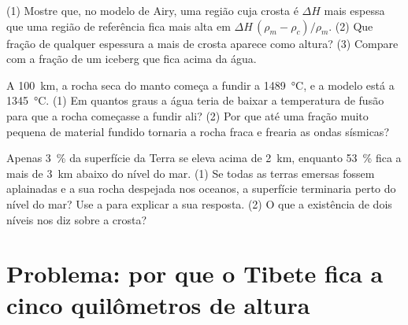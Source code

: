 \begin{exercise}[$\star\star\star$]\label{exo:g11:lithosphere-asthenosphere:13}
(1) Mostre que, no modelo de Airy, uma região cuja crosta é $\Delta H$ mais
espessa que uma região de referência fica mais alta em
$\Delta H\,(\rho_m - \rho_c)/\rho_m$. (2) Que fração de qualquer espessura a
mais de crosta aparece como altura? (3) Compare com a fração de um iceberg
que fica acima da água.
\end{exercise}

\begin{exercise}[$\star\star\star$]\label{exo:g11:lithosphere-asthenosphere:14}
A \qty{100}{km}, a rocha seca do manto começa a fundir a
\qty{1489}{\celsius}, e a  modelo está a \qty{1345}{\celsius}. (1)
Em quantos graus a água teria de baixar a temperatura de fusão para que a
rocha começasse a fundir ali? (2) Por que até uma fração muito pequena de
material fundido tornaria a rocha fraca e frearia as ondas sísmicas?
\end{exercise}

\begin{exercise}[$\star\star\star$]\label{exo:g11:lithosphere-asthenosphere:15}
Apenas \qty{3}{\percent} da superfície da Terra se eleva acima de
\qty{2}{km}, enquanto \qty{53}{\percent} fica a mais de \qty{3}{km} abaixo
do nível do mar. (1) Se todas as terras emersas fossem aplainadas e a sua
rocha despejada nos oceanos, a superfície terminaria perto do nível do mar?
Use a  para explicar a sua resposta. (2) O que a existência de dois
níveis nos diz sobre a crosta?
\end{exercise}

\section{Problema: por que o Tibete fica a cinco quilômetros de altura}

